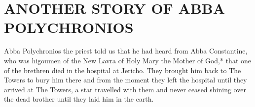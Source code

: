 \chapter{ANOTHER STORY OF ABBA POLYCHRONIOS}

Abba Polychronios the priest told us that he had heard from Abba Constantine, who was higoumen of the New Lavra of Holy Mary the Mother of God,* that one of the brethren died in the hospital at Jericho.
They brought him back to The Towers to bury him there and from the moment they left the hospital until they arrived at The Towers, a star travelled with them and never ceased shining over the dead brother until they laid him in the earth.
